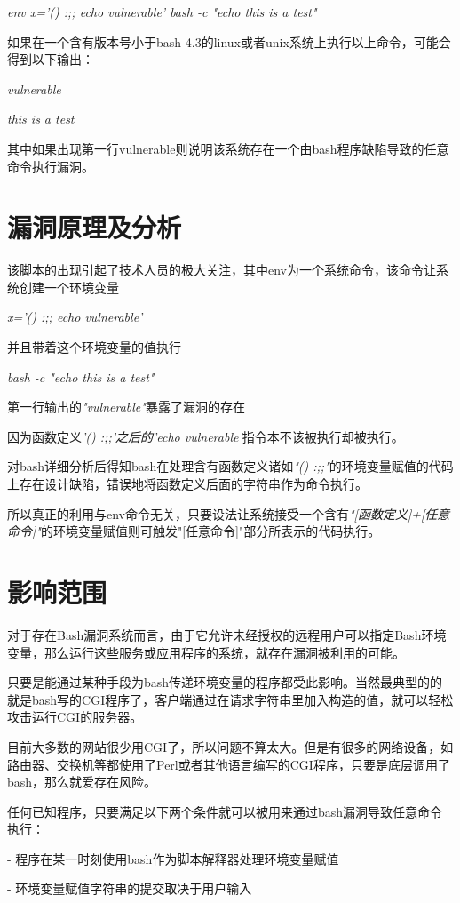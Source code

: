 \documentclass[11pt,journal,compsoc]{IEEEtran}
\begin{document}
\begin{CJK}{UTF8}{gkai}
\emph{env x='() { :;}; echo vulnerable' bash -c "echo this is a test"}

如果在一个含有版本号小于bash 4.3的linux或者unix系统上执行以上命令，可能会得到以下输出：

\emph{vulnerable}

\emph{this is a test}

其中如果出现第一行vulnerable则说明该系统存在一个由bash程序缺陷导致的任意命令执行漏洞。

\section{漏洞原理及分析}
该脚本的出现引起了技术人员的极大关注，其中env为一个系统命令，该命令让系统创建一个环境变量

\emph{x='() { :;}; echo vulnerable'}

并且带着这个环境变量的值执行

\emph{bash -c "echo this is a test"}

第一行输出的\emph{"vulnerable"}暴露了漏洞的存在

因为函数定义\emph{'() { :;};'之后的'echo vulnerable'}指令本不该被执行却被执行。

	对bash详细分析后得知bash在处理含有函数定义诸如\emph{"() { :;};"}的环境变量赋值的代码上存在设计缺陷，错误地将函数定义后面的字符串作为命令执行。

	所以真正的利用与env命令无关，只要设法让系统接受一个含有\emph{"[函数定义]+[任意命令]"}的环境变量赋值则可触发"[任意命令]"部分所表示的代码执行。


\section{影响范围}
对于存在Bash漏洞系统而言，由于它允许未经授权的远程用户可以指定Bash环境变量，那么运行这些服务或应用程序的系统，就存在漏洞被利用的可能。

只要是能通过某种手段为bash传递环境变量的程序都受此影响。当然最典型的的就是bash写的CGI程序了，客户端通过在请求字符串里加入构造的值，就可以轻松攻击运行CGI的服务器。

目前大多数的网站很少用CGI了，所以问题不算太大。但是有很多的网络设备，如路由器、交换机等都使用了Perl或者其他语言编写的CGI程序，只要是底层调用了bash，那么就爱存在风险。

任何已知程序，只要满足以下两个条件就可以被用来通过bash漏洞导致任意命令执行：

- 程序在某一时刻使用bash作为脚本解释器处理环境变量赋值

- 环境变量赋值字符串的提交取决于用户输入


\end{CJK}
\end{document}

